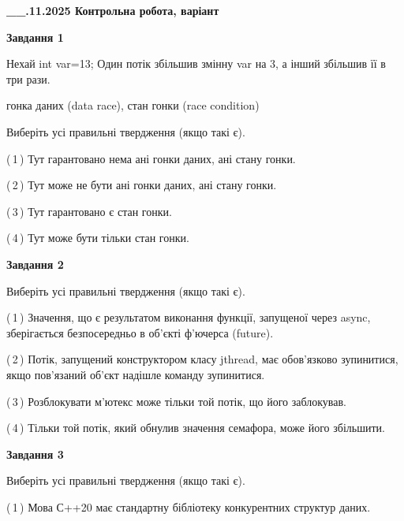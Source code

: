 \documentclass[12pt, ukrainian]{article}
\begin{document}
\begin {large}

\textbf{\_\_.11.2025 Контрольна робота, варіант  }\par


{

\begin{center}
\textbf{Завдання 1}
\end{center}
Нехай int var=13; Один потік збільшив змінну var на 3, а інший збільшив її в три рази.

гонка даних (data race), стан гонки (race condition)

Виберіть усі правильні твердження (якщо такі є).\par
\vspace{2mm}
(\,1\,) Тут гарантовано нема ані гонки даних, ані стану гонки.%

(\,2\,) Тут може не бути ані гонки даних, ані стану гонки.%

(\,3\,) Тут гарантовано є стан гонки.%

(\,4\,) Тут може бути тільки стан гонки.%



\begin{center}
\textbf{Завдання 2}
\end{center}
Виберіть усі правильні твердження (якщо такі є).\par
\vspace{2mm}

(\,1\,) Значення, що є результатом виконання функції, запущеної через async, зберігається безпосередньо в об’єкті ф’ючерса (future).%

(\,2\,) Потік, запущений конструктором класу jthread, має обов’язково зупинитися, якщо пов’язаний об’єкт надішле команду зупинитися.%

(\,3\,) Розблокувати м’ютекс може тільки той потік, що його заблокував.%

(\,4\,) Тільки той потік, який обнулив значення семафора, може його збільшити.%



\begin{center}
\textbf{Завдання 3}
\end{center}
Виберіть усі правильні твердження (якщо такі є).\par
\vspace{2mm}

(\,1\,) Мова С++20 має стандартну бібліотеку конкурентних структур даних.%

}
\end{large}
\end{document}
